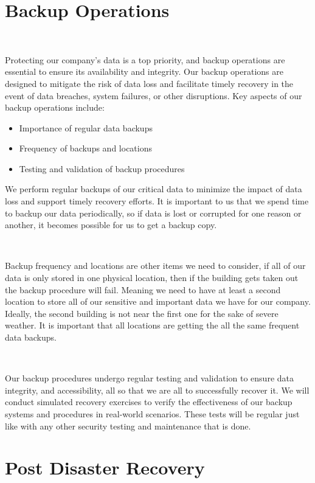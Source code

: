 \documentclass[12pt,a4paper]{report}
\begin{document}
\section{Backup Operations}
\

Protecting our company's data is a top priority, and backup operations are essential to ensure its availability and integrity.
Our backup operations are designed to mitigate the risk of data loss and facilitate timely recovery in the event of data breaches, system failures, or other disruptions. 
Key aspects of our backup operations include:
\begin{itemize}
 \item Importance of regular data backups
 \item Frequency of backups and locations
 \item Testing and validation of backup procedures
\end{itemize}

We perform regular backups of our critical data to minimize the impact of data loss and support timely recovery efforts. 
It is important to us that we spend time to backup our data periodically, so if data is lost or corrupted for one reason or another, it becomes possible for us to get a backup copy.

\

Backup frequency and locations are other items we need to consider, if all of our data is only stored in one physical location, then if the building gets taken out the backup procedure will fail.
Meaning we need to have at least a second location to store all of our sensitive and important data we have for our company.
Ideally, the second building is not near the first one for the sake of severe weather.
It is important that all locations are getting the all the same frequent data backups.

\

Our backup procedures undergo regular testing and validation to ensure data integrity, and accessibility, all so that we are all to successfully recover it.
We will conduct simulated recovery exercises to verify the effectiveness of our backup systems and procedures in real-world scenarios.
These tests will be regular just like with any other security testing and maintenance that is done.

\pagebreak

\section{Post Disaster Recovery} 
\
\end{document}
